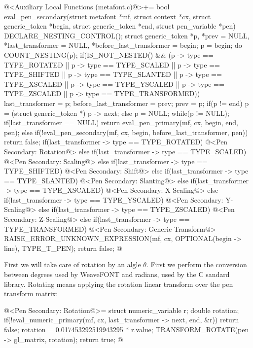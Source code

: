 {{{{{\iniciocodigo
@<Auxiliary Local Functions (metafont.c)@>+=
bool eval_pen_secondary(struct metafont *mf, struct context *cx,
                        struct generic_token *begin,
                        struct generic_token *end,
                        struct pen_variable *pen){
  DECLARE_NESTING_CONTROL();
  struct generic_token *p, *prev = NULL, *last_transformer = NULL,
                       *before_last_transformer = begin;
  p = begin;
  do{
    COUNT_NESTING(p);
    if(IS_NOT_NESTED() && (p -> type == TYPE_ROTATED ||
       p -> type == TYPE_SCALED || p -> type == TYPE_SHIFTED ||
       p -> type == TYPE_SLANTED || p -> type == TYPE_XSCALED ||
       p -> type == TYPE_YSCALED || p -> type == TYPE_ZSCALED ||
       p -> type == TYPE_TRANSFORMED)){
      last_transformer = p;
      before_last_transformer = prev;
    }
    prev = p;
    if(p != end)
      p = (struct generic_token *) p -> next;
    else
      p = NULL;
  }while(p != NULL);
  if(last_transformer == NULL)
    return eval_pen_primary(mf, cx, begin, end, pen);
  else{
    if(!eval_pen_secondary(mf, cx, begin, before_last_transformer, pen))
      return false;
    if(last_transformer -> type == TYPE_ROTATED){
      @<Pen Secondary: Rotation@>
    }
    else if(last_transformer -> type == TYPE_SCALED){
      @<Pen Secondary: Scaling@>
    }
    else if(last_transformer -> type == TYPE_SHIFTED){
      @<Pen Secondary: Shift@>
    }
    else if(last_transformer -> type == TYPE_SLANTED){
      @<Pen Secondary: Slanting@>
    }
    else if(last_transformer -> type == TYPE_XSCALED){
      @<Pen Secondary: X-Scaling@>
    }
    else if(last_transformer -> type == TYPE_YSCALED){
      @<Pen Secondary: Y-Scaling@>
    }
    else if(last_transformer -> type == TYPE_ZSCALED){
      @<Pen Secondary: Z-Scaling@>
    }
    else if(last_transformer -> type == TYPE_TRANSFORMED){
      @<Pen Secondary: Generic Transform@>
    }
    RAISE_ERROR_UNKNOWN_EXPRESSION(mf, cx, OPTIONAL(begin -> line),
                                   TYPE_T_PEN);
    return false;
  }
}
@
\fimcodigo

First we will take care of rotation by an algle $\theta$. First we
perform the conversion between degrees used by WeaveFONT and radians,
used by the C sandard library. Rotating means applying the rotation
linear transform over the pen transform matrix:

\iniciocodigo
@<Pen Secondary: Rotation@>=
struct numeric_variable r;
double rotation;
if(!eval_numeric_primary(mf, cx, last_transformer -> next, end, &r))
  return false;
rotation = 0.017453292519943295 * r.value;
TRANSFORM_ROTATE(pen -> gl_matrix, rotation);
return true;
@
\fimcodigo

}}}}}
